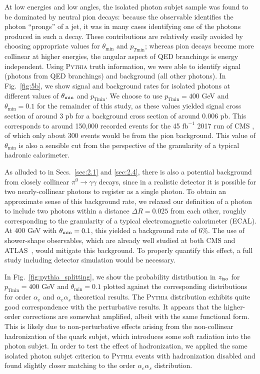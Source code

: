 \documentclass[a4paper,11pt]{article}
\DeclareRobustCommand{\Secs}[2]{Secs.~\ref{#1} and \ref{#2}}
\DeclareRobustCommand{\Fig}[1]{Fig.~\ref{#1}}
\newcommand{\ziso}{z_{\rm iso}}
\begin{document}
At low energies and low angles, the isolated photon subjet sample was found to be dominated by neutral pion decays: because the observable identifies the photon ``prongs'' of a jet, it was in many cases identifying one of the photons produced in such a decay.
%
These contributions are relatively easily avoided by choosing appropriate values for $\theta_{\text{min}}$ and $p_{T\text{min}}$; whereas pion decays become more collinear at higher energies, the angular aspect of QED branchings is energy independent.
%
Using \textsc{Pythia} truth information, we were able to identify signal (photons from QED branchings) and background (all other photons).
%
In \Fig{fig:5b}, we show signal and background rates for isolated photons at different values of $\theta_{\rm min}$ and $p_{T\text{min}}$.
%
We choose to use $p_{T\text{min}} = 400$ GeV and $\theta_{\text{min}} = 0.1$ for the remainder of this study, as these values yielded signal cross section of around 3 pb for a background cross section of around $0.006$ pb.
%
This corresponds to around 150,000 recorded events for the 45 $\text{fb}^{-1}$ 2017 run of CMS \cite{CMSLumi}, of which only about 300 events would be from the pion background.
%
This value of $\theta_{\text{min}}$ is also a sensible cut from the perspective of the granularity of a typical hadronic calorimeter.

As alluded to in \Secs{sec:2.1}{sec:2.4}, there is also a potential background from closely collinear $\pi^0 \rightarrow \gamma \gamma$ decays, since in a realistic detector it is possible for two nearly-collinear photons to register as a single photon. 
%
To obtain an approximate sense of this background rate, we relaxed our definition of a photon to include two photons within a distance $\Delta R = 0.025$ from each other, roughly corresponding to the granularity of a typical electromagnetic calorimeter (ECAL).
%
At 400 GeV with $\theta_{\rm min} = 0.1$, this yielded a background rate of 6\%.
%
The use of shower-shape observables, which are already well studied at both CMS and ATLAS~\cite{Khachatryan:2015iwa,Aaboud:2016yuq}, would mitigate this background.
%
To properly quantify this effect, a full study including detector simulation would be necessary.

In \Fig{fig:pythia_splitting}, we show the probability distribution in $\ziso$ for $p_{T\text{min}} = 400$ GeV and $\theta_{\text{min}} = 0.1$ plotted against the corresponding distributions for order $\alpha_e$ and $\alpha_e \alpha_s$ theoretical results.
%
The \textsc{Pythia} distribution exhibits quite good correspondence with the perturbative results.
%
It appears that the higher-order corrections are somewhat amplified, albeit with the same functional form.
%
This is likely due to non-perturbative effects arising from the non-collinear hadronization of the quark subjet, which introduces some soft radiation into the photon subjet.
%
In order to test the effect of hadronization, we applied the same isolated photon subjet criterion to \textsc{Pythia} events with hadronization disabled and found slightly closer matching to the order $\alpha_e \alpha_s$ distribution.
\end{document}
